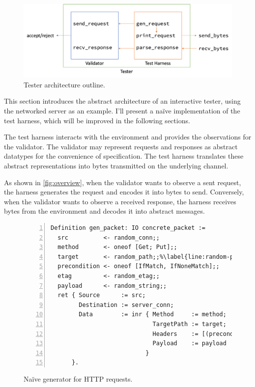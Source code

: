 \begin{figure}
  \centering
  \includegraphics[width=.9\textwidth]{figures/harness-outline}
  \caption{Tester architecture outline.}
  \label{fig:overview}
\end{figure}

This section introduces the abstract architecture of an interactive tester,
using the networked server as an example.  I'll present a na\"ive implementation
of the test harness, which will be improved in the following sections.

The test harness interacts with the environment and provides the observations
for the validator.  The validator may represent requests and responses as
abstract datatypes for the convenience of specification.  The test harness
translates these abstract representations into bytes transmitted on the
underlying channel.

As shown in \autoref{fig:overview}, when the validator wants to observe a sent
request, the harness generates the request and encodes it into bytes to send.
Conversely, when the validator wants to observe a received response, the harness
receives bytes from the environment and decodes it into abstract messages.

\begin{figure}
\begin{lstlisting}[numbers=left]
Definition gen_packet: IO concrete_packet :=
  src          <- random_conn;;
  method       <- oneof [Get; Put];;
  target       <- random_path;;%\label{line:random-path}%
  precondition <- oneof [IfMatch, IfNoneMatch];;
  etag         <- random_etag;;
  payload      <- random_string;;
  ret { Source      := src;
        Destination := server_conn;
        Data        := inr { Method     := method;
                             TargetPath := target;
                             Headers    := [(precondition, etag)];
                             Payload    := payload
                           }
      }.
\end{lstlisting}
\caption{Na\"ive generator for HTTP requests.}
\label{fig:naive-generator}
\end{figure}

